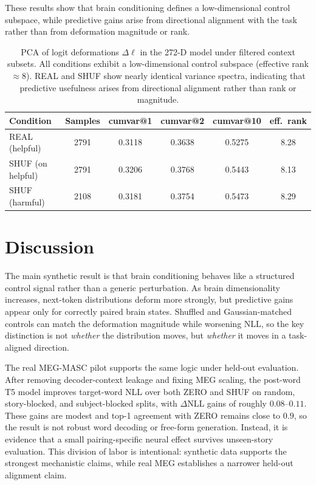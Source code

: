 \documentclass{article}
\theoremstyle{plain}
\theoremstyle{definition}
\theoremstyle{remark}
\begin{document}
 These results show that brain conditioning defines a low-dimensional control subspace, while predictive gains arise from directional alignment with the task rather than from deformation magnitude or rank.

\begin{table}[t]
\centering
\caption{PCA of logit deformations $\Delta \ell$ in the 272-D model under filtered context subsets.
All conditions exhibit a low-dimensional control subspace (effective rank $\approx 8$).
REAL and SHUF show nearly identical variance spectra, indicating that predictive usefulness arises from directional alignment rather than rank or magnitude.}
\label{tab:logit_pca_filtered_272}
\begin{tabular}{lccccc}
\toprule
Condition & Samples & cumvar@1 & cumvar@2 & cumvar@10 & eff.\ rank \\
\midrule
REAL (helpful) & 2791 & 0.3118 & 0.3638 & 0.5275 & 8.28 \\
SHUF (on helpful) & 2791 & 0.3206 & 0.3768 & 0.5443 & 8.13 \\
SHUF (harmful) & 2108 & 0.3181 & 0.3754 & 0.5473 & 8.29 \\
\bottomrule
\end{tabular}
\end{table}



\section{Discussion}

The main synthetic result is that brain conditioning behaves like a structured control signal rather than a generic perturbation.
As brain dimensionality increases, next-token distributions deform more strongly, but predictive gains appear only for correctly paired brain states.
Shuffled and Gaussian-matched controls can match the deformation magnitude while worsening NLL, so the key distinction is not \emph{whether} the distribution moves, but \emph{whether} it moves in a task-aligned direction.

The real MEG-MASC pilot supports the same logic under held-out evaluation.
After removing decoder-context leakage and fixing MEG scaling, the post-word T5 model improves target-word NLL over both ZERO and SHUF on random, story-blocked, and subject-blocked splits, with $\Delta$NLL gains of roughly $0.08$--$0.11$.
These gains are modest and top-1 agreement with ZERO remains close to $0.9$, so the result is not robust word decoding or free-form generation.
Instead, it is evidence that a small pairing-specific neural effect survives unseen-story evaluation.
This division of labor is intentional: synthetic data supports the strongest mechanistic claims, while real MEG establishes a narrower held-out alignment claim.
\end{document}
